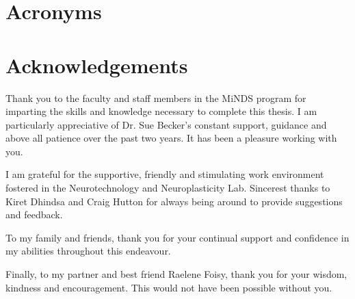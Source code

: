 \documentclass[
11pt, %
oneside, %
english, %
doublespacing
]{McMasterThesis} %
\begin{document}
\section*{\Huge Acronyms}
\printacronyms[name] %

\clearpage

\section*{Acknowledgements}

Thank you to the faculty and staff members in the MiNDS program for imparting 
the skills and knowledge necessary to complete this thesis. 
I am particularly appreciative of Dr. Sue Becker's 
constant support, guidance and above all patience over the past two 
years. It has been a pleasure working with you. 

I am grateful for the supportive, 
friendly and stimulating work environment fostered in the 
Neurotechnology and Neuroplasticity Lab.
Sincerest thanks to Kiret Dhindsa and Craig Hutton for 
always being around to provide suggestions and feedback.

To my family and friends, thank you for your continual support and confidence in my 
abilities throughout this endeavour.

Finally, to my partner and best friend Raelene Foisy, thank you for your wisdom, kindness 
and encouragement. This would not have been possible without you.



\tableofcontents %



%
%
% 
% 
\end{document}

